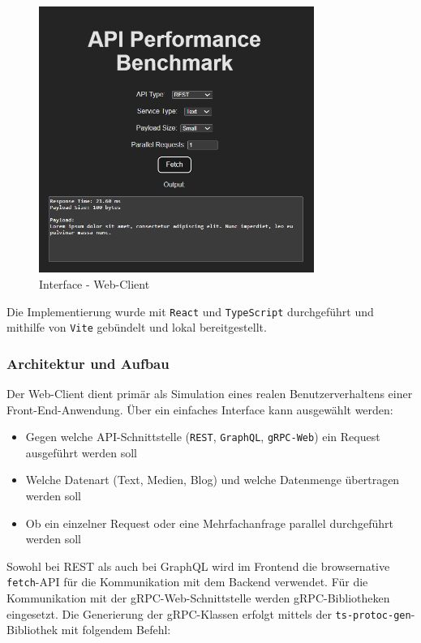 \begin{enumerate}
	\begin{figure}[hbtp]
		\centering
		\includegraphics[width=0.8\textwidth]{images/frontendclient.png}
		\caption{Interface - Web-Client}
		\label{fig:frontendclient}
	\end{figure}
	
	 Die Implementierung wurde mit \texttt{React} und \texttt{TypeScript} durchgeführt und mithilfe von \texttt{Vite} gebündelt und lokal bereitgestellt.
	
	\subsubsection*{Architektur und Aufbau}
	Der Web-Client dient primär als Simulation eines realen Benutzerverhaltens einer Front-End-Anwendung. Über ein einfaches Interface kann ausgewählt werden:
	\begin{itemize}
		\item Gegen welche API-Schnittstelle (\texttt{REST}, \texttt{GraphQL}, \texttt{gRPC-Web}) ein Request ausgeführt werden soll
		\item Welche Datenart (Text, Medien, Blog) und welche Datenmenge übertragen werden soll
		\item Ob ein einzelner Request oder eine Mehrfachanfrage parallel durchgeführt werden soll
	\end{itemize}
	
	Sowohl bei REST als auch bei GraphQL wird im Frontend die browsernative \texttt{fetch}-API für die Kommunikation mit dem Backend verwendet.  
	Für die Kommunikation mit der gRPC-Web-Schnittstelle werden gRPC-Bibliotheken eingesetzt. Die Generierung der gRPC-Klassen erfolgt mittels der \texttt{ts-protoc-gen}-Bibliothek mit folgendem Befehl:
	

\end{enumerate}
